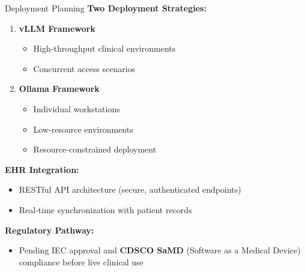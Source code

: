 ﻿\documentclass[aspectratio=169]{beamer}
\newcommand{\scite}[1]{{\footnotesize\color{darkgray}\citet{#1}}}
\begin{document}
\begin{frame}{Deployment Planning}
\textbf{Two Deployment Strategies:}

\begin{enumerate}
    \item \textbf{vLLM Framework} \scite{kwon2023vllm}
    \begin{itemize}
        \item High‑throughput clinical environments
        \item Concurrent access scenarios
    \end{itemize}
    
    \item \textbf{Ollama Framework} \scite{kwon2023vllm}
    \begin{itemize}
        \item Individual workstations
        \item Low‑resource environments
        \item Resource‑constrained deployment
    \end{itemize}
\end{enumerate}

\vspace{1em}
\textbf{EHR Integration:}
\begin{itemize}
    \item RESTful API architecture (secure, authenticated endpoints)
    \item Real‑time synchronization with patient records
\end{itemize}
\vspace{0.5em}
\textbf{Regulatory Pathway:}
\begin{itemize}
    \item Pending IEC approval and \textbf{CDSCO SaMD} (Software as a Medical Device) compliance before live clinical use
\end{itemize}
\end{frame}
\end{document}
